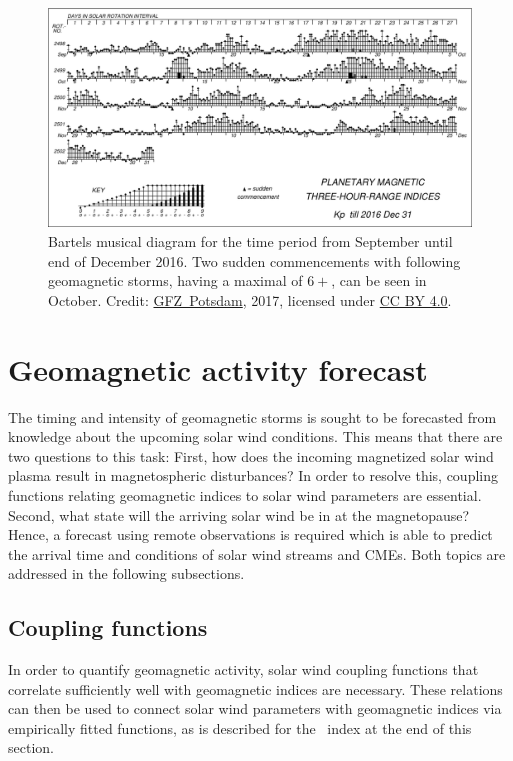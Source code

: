 \begin{figure}[htb]
	\centering
	\includegraphics[width=\textwidth]{figures_of_others/images/musi1612.pdf}
	\caption[Credit: \href{http://www.gfz-potsdam.de/en/kp-index/}{GFZ~Potsdam}, 2017, licensed under \href{https://creativecommons.org/licenses/by/4.0/}{CC BY 4.0}.]
	{Bartels musical \Kp{} diagram for the time period from September until end of December 2016. Two sudden commencements with following geomagnetic storms, having a maximal \Kp{} of $6+$, can be seen in October. Credit: \href{http://www.gfz-potsdam.de/en/kp-index/}{GFZ~Potsdam}, 2017, licensed under \href{https://creativecommons.org/licenses/by/4.0/}{CC BY 4.0}.}
	\label{fig:musi1612}
\end{figure}

\clearpage

\section{Geomagnetic activity forecast}
\label{sec:geomagnetic_activity_forecast}
The timing and intensity of geomagnetic storms is sought to be forecasted from knowledge about the upcoming solar wind conditions. This means that there are two questions to this task: First, how does the incoming magnetized solar wind plasma result in magnetospheric disturbances? In order to resolve this, coupling functions relating geomagnetic indices to solar wind parameters are essential. Second, what state will the arriving solar wind be in at the magnetopause? Hence, a forecast using remote observations is required which is able to predict the arrival time and conditions of solar wind streams and CMEs. Both topics are addressed in the following subsections.


\subsection{Coupling functions}
\label{sec:coupling_functions}
In order to quantify geomagnetic activity, solar wind coupling functions that correlate sufficiently well with geomagnetic indices are necessary. These relations can then be used to connect solar wind parameters with geomagnetic indices via empirically fitted functions, as is described for the \Kp~index at the end of this section.

